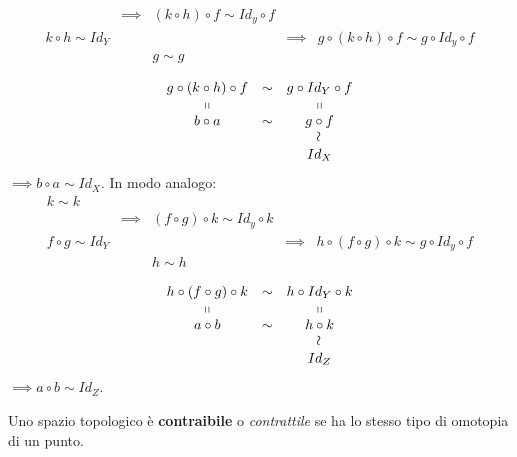 \begin{demonstration}
\begin{itemize}
\begin{equation*}
\begin{array}{cccccc}
			& \implies & \left(k\circ h\right)\circ f\sim Id_y\circ f& &\\
			k\circ h\sim Id_Y& & &\implies &g\circ \left(k\circ h\right)\circ f\sim g\circ Id_y\circ f \\
			& & g\sim g & &\\
		\end{array}
	\end{equation*}
	\begin{equation*}
	\begin{array}{ccc}
		g\circ \left(k\circ h\right)\circ f& \sim & g\circ Id_Y\circ f\\
		\shortparallel & & \shortparallel\\
		b\circ a & \sim & g\circ f\\
		& & \rotatebox{90}{$\sim$}\\
		& & Id_X
	\end{array}
	\end{equation*}
$\implies b\circ a\sim Id_X$. In modo analogo:
\begin{equation*}
	\begin{array}{cccccc}
		k\sim k & & & &\\
		& \implies & \left(f\circ g\right)\circ k\sim Id_y\circ k& &\\
		f\circ g\sim Id_Y& & &\implies &h\circ \left(f\circ g\right)\circ k\sim g\circ Id_y\circ f \\
		& & h\sim h & &\\
	\end{array}
\end{equation*}
\begin{equation*}
	\begin{array}{ccc}
		h\circ \left(f\circ g\right)\circ k& \sim & h\circ Id_Y\circ k\\
		\shortparallel & & \shortparallel\\
		a\circ b & \sim & h\circ k\\
		& & \rotatebox{90}{$\sim$}\\
		& & Id_Z
	\end{array}
\end{equation*}
$\implies a\circ b\sim Id_Z$.
\end{itemize}
\end{demonstration}
\begin{define}
	Uno spazio topologico è \textbf{contraibile} o \textit{contrattile} se ha lo stesso tipo di omotopia di un punto.
\end{define}

